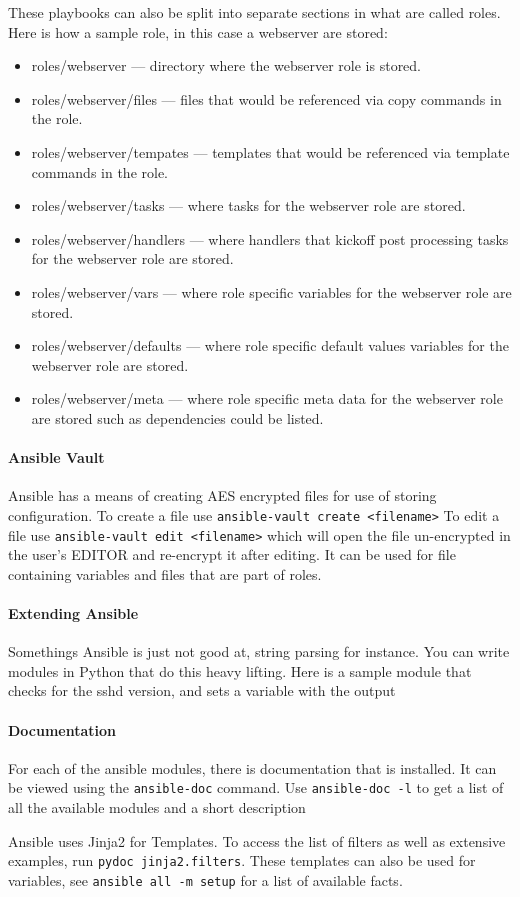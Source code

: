 These playbooks can also be split into separate sections in what are called roles.
Here is how a sample role, in this case a webserver are stored:
\begin{itemize}
\item roles/webserver --- directory where the webserver role is stored.
\item roles/webserver/files --- files that would be referenced via copy commands in the role.
\item roles/webserver/tempates --- templates that would be referenced via template commands in the role.
\item roles/webserver/tasks --- where tasks for the webserver role are stored.
\item roles/webserver/handlers --- where handlers that kickoff post processing tasks for the webserver role are stored.
\item roles/webserver/vars --- where role specific variables for the webserver role are stored.
\item roles/webserver/defaults --- where role specific default values variables for the webserver role are stored.
\item roles/webserver/meta --- where role specific meta data for the webserver role are stored such as dependencies could be listed.
\end{itemize}

\paragraph{Ansible Vault}
Ansible has a means of creating AES encrypted files for use of storing configuration.
To create a file use \lstinline|ansible-vault create <filename>|
To edit a file use \lstinline|ansible-vault edit <filename>| which will open the file un-encrypted in the user's EDITOR and re-encrypt it after editing.
It can be used for file containing variables and files that are part of roles.

\paragraph{Extending Ansible}
Somethings Ansible is just not good at, string parsing for instance.
You can write modules in Python that do this heavy lifting.
Here is a sample module that checks for the sshd version, and sets a variable with the output


\paragraph{Documentation}
For each of the ansible modules, there is documentation that is installed.
It can be viewed using the \lstinline|ansible-doc| command.
Use \lstinline|ansible-doc -l| to get a list of all the available modules and a short description

Ansible uses Jinja2 for Templates.
To access the list of filters as well as extensive examples, run \lstinline|pydoc jinja2.filters|.
These templates can also be used for variables, see \lstinline|ansible all -m setup| for a list of available facts.
